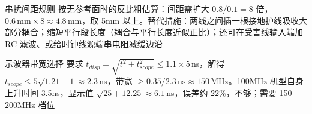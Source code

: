 \begin{chapteranswer}{串扰间距规则}
按无参考面时的反比粗估算：间距需扩大 $0.8/0.1 = 8$ 倍，$0.6\,\mathrm{mm} \times 8 \approx 4.8$\,mm，取 5mm 以上。替代措施：两线之间插一根接地护线吸收大部分耦合；缩短平行段长度（耦合与平行长度近似正比）；还可在受害线输入端加 RC 滤波、或给时钟线源端串电阻减缓边沿
\end{chapteranswer}

\begin{chapteranswer}{示波器带宽选择}
要求 $t_{disp} = \sqrt{t^2 + t_{scope}^2} \leq 1.1 \times 5$\,ns，解得 $t_{scope} \leq 5\sqrt{1.21-1} \approx 2.3$\,ns，带宽 $\geq 0.35/2.3\,\mathrm{ns} \approx 150$\,MHz。100MHz 机型自身上升时间 3.5ns，显示值 $\sqrt{25+12.25} \approx 6.1$\,ns，误差约 22\%，不够；需要 150--200MHz 档位
\end{chapteranswer}
